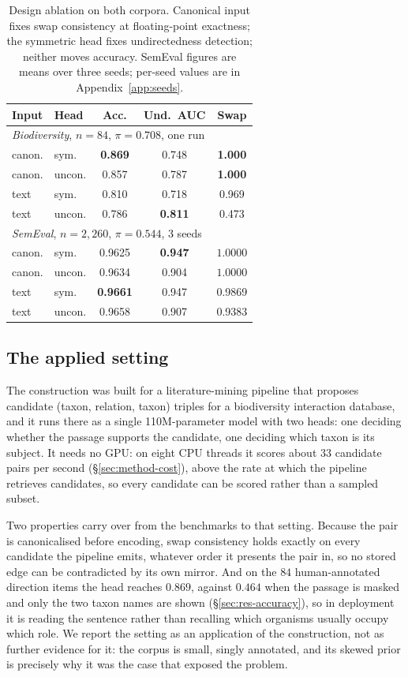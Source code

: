 \documentclass[11pt]{article}
\begin{document}
\begin{table}[t]
\centering\small
\begin{tabular}{llccc}
\toprule
Input & Head & Acc. & Und.\ AUC & Swap \\
\midrule
\multicolumn{5}{l}{\emph{Biodiversity}, $n=84$, $\pi=0.708$, one run} \\
canon. & sym.   & \textbf{0.869} & 0.748 & \textbf{1.000} \\
canon. & uncon. & 0.857 & 0.787 & \textbf{1.000} \\
text   & sym.   & 0.810 & 0.718 & 0.969 \\
text   & uncon. & 0.786 & \textbf{0.811} & 0.473 \\
\midrule
\multicolumn{5}{l}{\emph{SemEval}, $n=2{,}260$, $\pi=0.544$, 3 seeds} \\
canon. & sym.   & 0.9625 & \textbf{0.947} & $\mathbf{1.0000}$ \\
canon. & uncon. & 0.9634 & 0.904 & $\mathbf{1.0000}$ \\
text   & sym.   & \textbf{0.9661} & 0.947 & 0.9869 \\
text   & uncon. & 0.9658 & 0.907 & 0.9383 \\
\bottomrule
\end{tabular}
\caption{Design ablation on both corpora. Canonical input fixes swap consistency at floating-point
exactness; the symmetric head fixes undirectedness detection; neither moves accuracy. SemEval
figures are means over three seeds; per-seed values are in Appendix~\ref{app:seeds}.}
\label{tab:ablation}
\end{table}

\subsection{The applied setting}
\label{sec:res-applied}
The construction was built for a literature-mining pipeline that proposes candidate
(taxon, relation, taxon) triples for a biodiversity interaction database, and it runs there as a
single 110M-parameter model with two heads: one deciding whether the passage supports the
candidate, one deciding which taxon is its subject. It needs no GPU: on eight CPU threads it
scores about $33$ candidate pairs per second (\S\ref{sec:method-cost}), above the rate at which the
pipeline retrieves candidates, so every candidate can be scored rather than a sampled subset.

Two properties carry over from the benchmarks to that setting. Because the pair is canonicalised
before encoding, swap consistency holds exactly on every candidate the pipeline emits, whatever
order it presents the pair in, so no stored edge can be contradicted by its own mirror. And on the $84$ human-annotated direction items the head reaches
$0.869$, against $0.464$ when the passage is masked and only the two taxon names are shown
(\S\ref{sec:res-accuracy}), so in deployment it is reading the sentence rather than recalling
which organisms usually occupy which role. We report the setting as an application of the
construction, not as further evidence for it: the corpus is small, singly annotated, and its
skewed prior is precisely why it was the case that exposed the problem.
\end{document}
